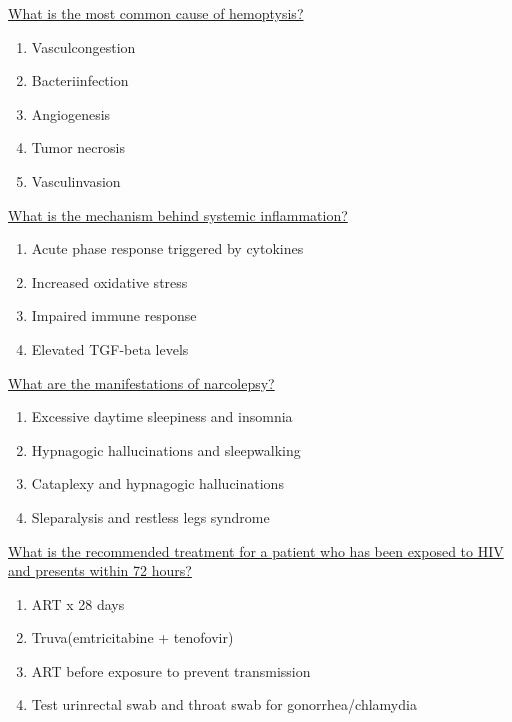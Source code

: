\documentclass[10pt, a4paper]{article}
\begin{document}
\begin{enumerate}
 \vspace{12pt} 

\parbox{\linewidth}{\item \href{https://www.notion.so/Haemoptysis-Shortness-of-Breath-1231f6571aef41418d3ddfecbcca0294}{ What is the most common cause of hemoptysis?} 
 \begin{enumerate}
 \item      Vasculcongestion
 \item      Bacteriinfection
 \item      Angiogenesis
 \item      Tumor necrosis
 \item      Vasculinvasion
 \end{enumerate}} 

 \vspace{12pt} 

\parbox{\linewidth}{\item \href{https://www.notion.so/Rheumatological-Red-Flags-f1e272d9fc58490c91d0dc71957262dc}{ What is the mechanism behind systemic inflammation?} 
 \begin{enumerate}
 \item Acute phase response triggered by cytokines
 \item Increased oxidative stress
 \item Impaired immune response
 \item Elevated TGF-beta levels
 \end{enumerate}} 

 \vspace{12pt} 

\parbox{\linewidth}{\item \href{https://www.notion.so/Sleep-Disorders-9096f10c9d284955b5fb754965e66fea}{ What are the manifestations of narcolepsy?} 
 \begin{enumerate}
 \item      Excessive daytime sleepiness and insomnia
 \item      Hypnagogic hallucinations and sleepwalking
 \item      Cataplexy and hypnagogic hallucinations
 \item      Sleparalysis and restless legs syndrome
 \end{enumerate}} 

 \vspace{12pt} 

\parbox{\linewidth}{\item \href{https://www.notion.so/HIV-e8425ab8632542908ec36ddeca89de55}{ What is the recommended treatment for a patient who has been exposed to HIV and presents within 72 hours?} 
 \begin{enumerate}
 \item ART x 28 days
 \item Truva(emtricitabine + tenofovir)
 \item ART before exposure to prevent transmission
 \item Test urinrectal swab and throat swab for gonorrhea/chlamydia
 \end{enumerate}} 


\end{enumerate}
\end{document}
